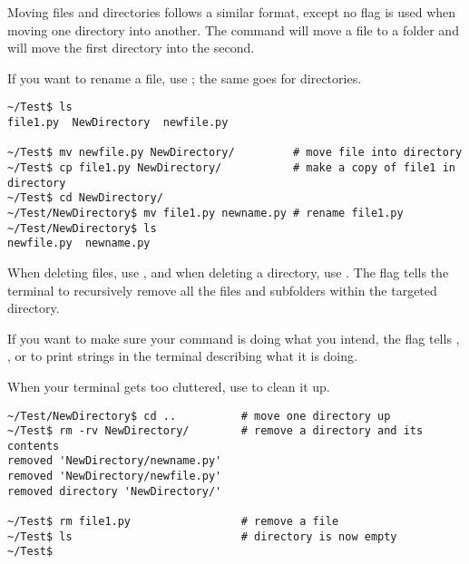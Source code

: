 Moving files and directories follows a similar format, except no  flag is used when moving one directory into another.
The command  will move a file to a folder and  will move the first directory into the second.

If you want to rename a file, use ; the same goes for directories.

\begin{lstlisting}
~/Test$ ls
file1.py  NewDirectory  newfile.py	

~/Test$ mv newfile.py NewDirectory/			# move file into directory
~/Test$ cp file1.py NewDirectory/			# make a copy of file1 in directory
~/Test$ cd NewDirectory/				
~/Test/NewDirectory$ mv file1.py newname.py	# rename file1.py
~/Test/NewDirectory$ ls
newfile.py  newname.py
\end{lstlisting}

When deleting files, use , and when deleting a directory, use .
The  flag tells the terminal to recursively remove all the files and subfolders within the targeted directory.

If you want to make sure your command is doing what you intend, the  flag tells , , or  to print strings in the terminal describing what it is doing.

When your terminal gets too cluttered, use  to clean it up.



\begin{lstlisting}
~/Test/NewDirectory$ cd ..			# move one directory up
~/Test$ rm -rv NewDirectory/		# remove a directory and its contents
removed 'NewDirectory/newname.py'
removed 'NewDirectory/newfile.py'
removed directory 'NewDirectory/'

~/Test$ rm file1.py 				# remove a file
~/Test$ ls							# directory is now empty
~/Test$
\end{lstlisting}



